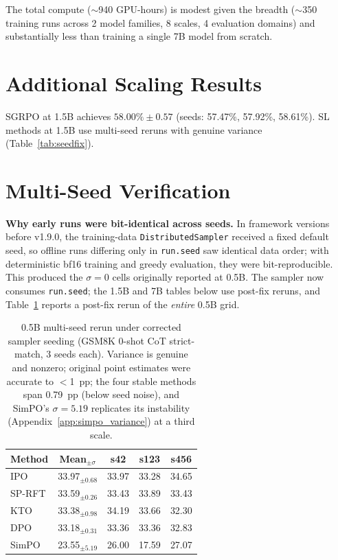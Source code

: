 \documentclass{article}
\newcommand{\sprft}{SP-RFT}
\begin{document}
The total compute ($\sim$940 GPU-hours) is modest given the breadth ($\sim$350 training runs across 2 model families, 8 scales, 4 evaluation domains) and substantially less than training a single 7B model from scratch.

\section{Additional Scaling Results}
\label{app:scaling}

SGRPO at 1.5B achieves $58.00\% \pm 0.57$ (seeds: 57.47\%, 57.92\%, 58.61\%).
SL methods at 1.5B use multi-seed reruns with genuine variance (Table~\ref{tab:seedfix}).

\section{Multi-Seed Verification}
\label{app:seed_invariance}

\textbf{Why early runs were bit-identical across seeds.} In framework versions before v1.9.0, the training-data \texttt{DistributedSampler} received a fixed default seed, so offline runs differing only in \texttt{run.seed} saw identical data order; with deterministic bf16 training and greedy evaluation, they were bit-reproducible. This produced the $\sigma{=}0$ cells originally reported at 0.5B. The sampler now consumes \texttt{run.seed}; the 1.5B and 7B tables below use post-fix reruns, and Table~\ref{tab:seedfix_05b} reports a post-fix rerun of the \emph{entire} 0.5B grid.

\begin{table}[ht]
\centering
\caption{0.5B multi-seed rerun under corrected sampler seeding (GSM8K 0-shot CoT strict-match, 3 seeds each). Variance is genuine and nonzero; original point estimates were accurate to $<$1~pp; the four stable methods span 0.79~pp (below seed noise), and SimPO's $\sigma{=}5.19$ replicates its instability (Appendix~\ref{app:simpo_variance}) at a third scale.}
\label{tab:seedfix_05b}
\small
\begin{tabular}{@{}lcccc@{}}
\toprule
\textbf{Method} & \textbf{Mean$_{\pm\sigma}$} & \textbf{s42} & \textbf{s123} & \textbf{s456} \\
\midrule
IPO & 33.97$_{\pm 0.68}$ & 33.97 & 33.28 & 34.65 \\
\sprft{} & 33.59$_{\pm 0.26}$ & 33.43 & 33.89 & 33.43 \\
KTO & 33.38$_{\pm 0.98}$ & 34.19 & 33.66 & 32.30 \\
DPO & 33.18$_{\pm 0.31}$ & 33.36 & 33.36 & 32.83 \\
SimPO & 23.55$_{\pm 5.19}$ & 26.00 & 17.59 & 27.07 \\
\bottomrule
\end{tabular}
\end{table}
\end{document}
